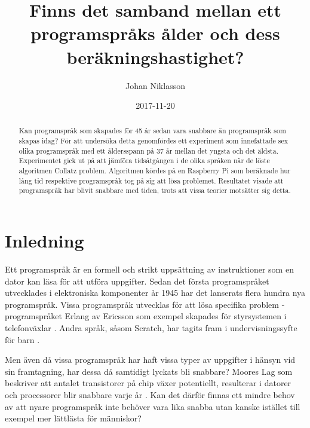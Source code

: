 \documentclass[12pt,swedish]{article}
\title{Finns det samband mellan ett programspråks ålder och dess beräkningshastighet?}
\author{Johan Niklasson}
\date{2017-11-20}
\begin{document}

\maketitle
\normalsize
\begin{center}

\begin{abstract}
Kan programspråk som skapades för 45 år sedan vara snabbare än programspråk som skapas idag? För att undersöka detta genomfördes ett experiment som innefattade sex olika programspråk med ett åldersspann på 37 år mellan det yngsta och det äldsta. Experimentet gick ut på att jämföra tidsåtgången i de olika språken när de löste algoritmen Collatz problem. Algoritmen kördes på en Raspberry Pi som beräknade hur lång tid respektive programspråk tog på sig att lösa problemet. Resultatet visade att programspråk har blivit snabbare med tiden, trots att vissa teorier motsätter sig detta.
\end{abstract}
\end{center}
\clearpage

\tableofcontents

\listoftables
\listoffigures
\clearpage



\section{Inledning}
Ett programspråk är en formell och strikt uppsättning av instruktioner som en dator kan läsa för att utföra uppgifter. Sedan det första programspråket utvecklades i elektroniska komponenter år 1945 \citep{bauer_wossner_1972} har det lanserats flera hundra nya programspråk. Vissa programspråk utvecklas för att lösa specifika problem - programspråket Erlang av Ericsson som exempel skapades för styrsystemen i telefonväxlar \citep{armstrong_1997}. Andra språk, såsom Scratch, har tagits fram i undervisningssyfte för barn \citep{maloney_resnick_rusk_silverman_eastmond_2010}.

Men även då vissa programspråk har haft vissa typer av uppgifter i hänsyn vid sin framtagning, har dessa då samtidigt lyckats bli snabbare? Moores Lag som beskriver att antalet transistorer på chip växer potentiellt, resulterar i datorer och processorer blir snabbare varje år \citep{schaller_1997}. Kan det därför finnas ett mindre behov av att nyare programspråk inte behöver vara lika snabba utan kanske istället till exempel mer lättlästa för människor?
\end{document}
